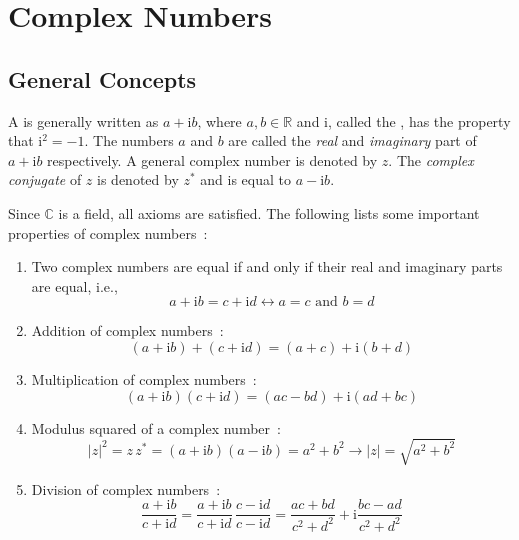 \section{Complex Numbers}
\label{\chabbr:sec:complex}

\subsection{General Concepts}

A  is generally written as $a+\mathrm{i}b$, where $a, b\in\mathbb{R}$ and $\mathrm{i}$, called the ,
has the property that $\mathrm{i}^2=-1$.  The numbers $a$ and $b$ are called the \textit{real} and \textit{imaginary} part of $a+\mathrm{i}b$ respectively.
A general complex number is denoted by $z$.  The \textit{complex conjugate} of $z$ is denoted by $z^{\ast}$ and is equal to $a-\mathrm{i}b$.

\noindent Since $\mathbb{C}$ is a field, all axioms are satisfied.  The following lists some important properties of complex numbers~:
\begin{enumerate}
\item Two complex numbers are equal if and only if their real and imaginary parts are equal, i.e.,
\begin{equation}
a+\mathrm{i}b=c+\mathrm{i}d \leftrightarrow a=c\text{ and }b=d
\end{equation}

\item Addition of complex numbers~:
\begin{equation}
(a+\mathrm{i}b)+(c+\mathrm{i}d)=(a+c)+\mathrm{i}(b+d)
\end{equation}

\item Multiplication of complex numbers~:
\begin{equation}
(a+\mathrm{i}b)(c+\mathrm{i}d)=(ac-bd)+\mathrm{i}(ad+bc)
\end{equation}

\item Modulus squared of a complex number~:
\begin{equation}
\vert z\vert^2=z\,z^{\ast}=(a+\mathrm{i}b)(a-\mathrm{i}b)=a^2+b^2\rightarrow \vert z\vert = \sqrt{a^2+b^2}
\end{equation}

\item Division of complex numbers~:
\begin{equation}
\frac{a+\mathrm{i}b}{c+\mathrm{i}d}=\frac{a+\mathrm{i}b}{c+\mathrm{i}d}\,\frac{c-\mathrm{i}d}{c-\mathrm{i}d}=
\frac{ac+bd}{c^2+d^2}+\mathrm{i}\frac{bc-ad}{c^2+d^2}
\end{equation}
\end{enumerate}

